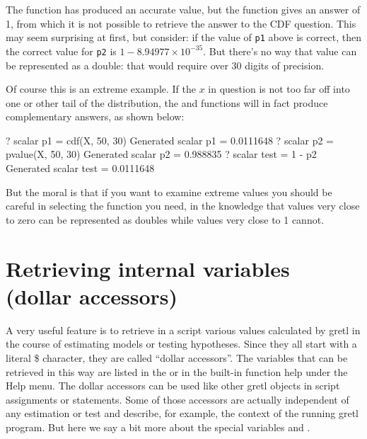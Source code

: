 The  function has produced an accurate value, but the
 function gives an answer of 1, from which it is not
possible to retrieve the answer to the CDF question.  This may seem
surprising at first, but consider: if the value of \texttt{p1} above
is correct, then the correct value for \texttt{p2} is $1 - 8.94977
\times 10^{-35}$.  But there's no way that value can be represented as
a double: that would require over 30 digits of precision.

Of course this is an extreme example.  If the $x$ in question is not
too far off into one or other tail of the distribution, the 
and  functions will in fact produce complementary
answers, as shown below:
\begin{code}
? scalar p1 = cdf(X, 50, 30)
Generated scalar p1 = 0.0111648
? scalar p2 = pvalue(X, 50, 30)
Generated scalar p2 = 0.988835
? scalar test = 1 - p2
Generated scalar test = 0.0111648
\end{code}
But the moral is that if you want to examine extreme values
you should be careful in selecting the function you need, in the
knowledge that values very close to zero can be represented as doubles
while values very close to 1 cannot.


\section{Retrieving internal variables (dollar accessors)}
\label{sec:genr-internal}

A very useful feature is to retrieve in a script various values
calculated by gretl in the course of estimating models or testing
hypotheses. Since they all start with a literal \$ character, they
are called ``dollar accessors''. The variables that can be retrieved
in this way are listed in the \GCR or in the built-in function help
under the Help menu. The dollar accessors can be used like other
gretl objects in script assignments or statements. Some of those
accessors are actually independent of any estimation or test and
describe, for example, the context of the running gretl program. 
But here we say a bit more about the special variables
 and .

